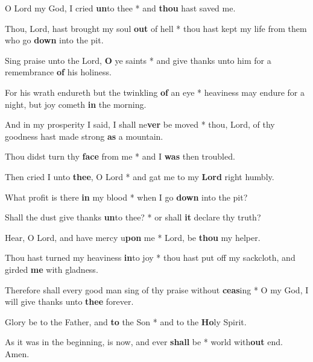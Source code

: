 \begin{multicols}{2}
	O Lord my God, I cried \textbf{un}to thee * and \textbf{thou} hast saved me.
	
	Thou, Lord, hast brought my soul \textbf{out} of hell * thou hast kept my life from them who go \textbf{down} into the pit.
	
	Sing praise unto the Lord, \textbf{O} ye saints * and give thanks unto him for a remembrance \textbf{of} his holiness.
	
	For his wrath endureth but the twinkling \textbf{of} an eye * heaviness may endure for a night, but joy cometh \textbf{in} the morning.
	
	And in my prosperity I said, I shall ne\textbf{ver} be moved * thou, Lord, of thy goodness hast made strong \textbf{as} a mountain.
	
	Thou didst turn thy \textbf{face} from me * and I \textbf{was} then troubled.
	
	Then cried I unto \textbf{thee}, O Lord * and gat me to my \textbf{Lord} right humbly.
	
	What profit is there \textbf{in} my blood * when I go \textbf{down} into the pit?
	
	Shall the dust give thanks \textbf{un}to thee? * or shall \textbf{it} declare thy truth?
	
	Hear, O Lord, and have mercy u\textbf{pon} me * Lord, be \textbf{thou} my helper.
	
	Thou hast turned my heaviness \textbf{in}to joy * thou hast put off my sackcloth, and girded \textbf{me} with gladness.
	
	Therefore shall every good man sing of thy praise without \textbf{ceas}ing * O my God, I will give thanks unto \textbf{thee} forever.
	
	Glory be to the Father, and \textbf{to} the Son * and to the \textbf{Ho}ly Spirit.
	
	As it was in the beginning, is now, and ever \textbf{shall} be * world with\textbf{out} end. Amen.
\end{multicols}